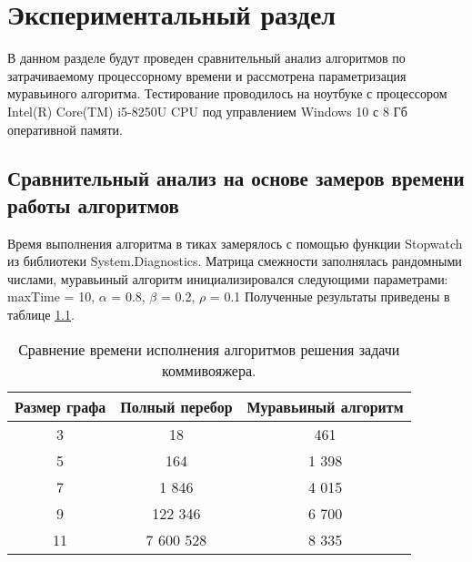 \chapter{Экспериментальный раздел}
\label{cha:research}
    В данном разделе будут проведен  
    сравнительный анализ алгоритмов по затрачиваемому процессорному 
    времени и рассмотрена параметризация муравьиного алгоритма.
    Тестирование проводилось на ноутбуке с процессором
    Intel(R) Core(TM) i5-8250U CPU \cite{proc}
    под управлением Windows 10 с 8 Гб оперативной памяти.

    \section{Сравнительный анализ на основе замеров времени работы алгоритмов}
        Время выполнения алгоритма в тиках замерялось с помощью функции Stopwatch
        из библиотеки System.Diagnostics.
        Матрица смежности заполнялась рандомными числами,
        муравьиный алгоритм инициализировался следующими параметрами:
        maxTime = 10, $\alpha$ = 0.8, $\beta$ = 0.2, $\rho$ = 0.1
        Полученные результаты приведены в таблице \ref{table:test:time}.
        
        \begin{table}[h!]
            \begin{center}
                \begin{tabular}{|c|c|c|}
                    \hline
                    Размер графа & Полный перебор & Муравьиный алгоритм \\ \hline
                    3            & 18             & 461             \\ \hline
                    5            & 164            & 1 398           \\ \hline
                    7            & 1 846          & 4 015           \\ \hline
                    9            & 122 346        & 6 700           \\ \hline
                    11           & 7 600 528      & 8 335           \\ 
                    \hline
                \end{tabular}
            \end{center}
            \caption{Сравнение времени исполнения алгоритмов решения задачи коммивояжера.}
            \label{table:test:time}
        \end{table}      
        
